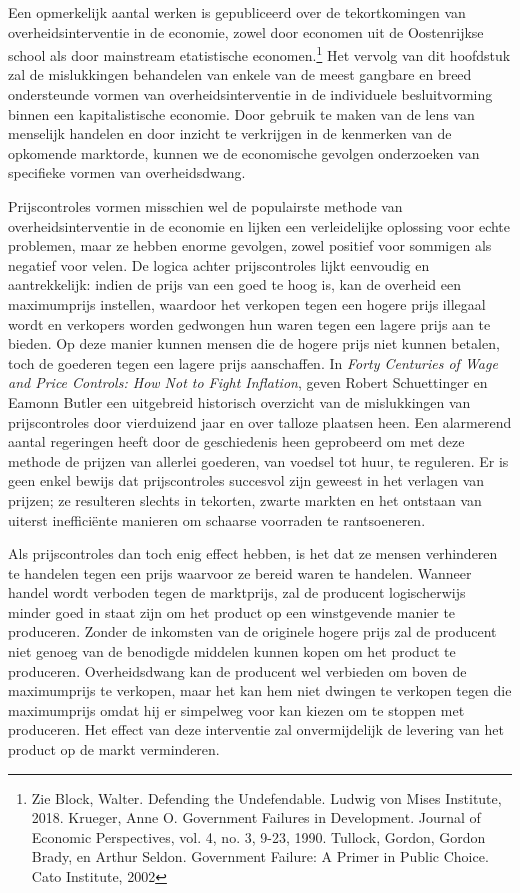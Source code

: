 Een opmerkelijk aantal werken is gepubliceerd over de tekortkomingen van overheidsinterventie in de economie, zowel door economen uit de Oostenrijkse school als door mainstream etatistische economen.\footnote{Zie Block, Walter. Defending the Undefendable. Ludwig von Mises Institute, 2018. Krueger, Anne O. Government Failures in Development. Journal of Economic Perspectives, vol. 4, no. 3, 9-23, 1990. Tullock, Gordon, Gordon Brady, en Arthur Seldon. Government Failure: A Primer in Public Choice. Cato Institute, 2002} Het vervolg van dit hoofdstuk zal de mislukkingen behandelen van enkele van de meest gangbare en breed ondersteunde vormen van overheidsinterventie in de individuele besluitvorming binnen een kapitalistische economie. Door gebruik te maken van de lens van menselijk handelen en door inzicht te verkrijgen in de kenmerken van de opkomende marktorde, kunnen we de economische gevolgen onderzoeken van specifieke vormen van overheidsdwang.

Prijscontroles vormen misschien wel de populairste methode van overheidsinterventie in de economie en lijken een verleidelijke oplossing voor echte problemen, maar ze hebben enorme gevolgen, zowel positief voor sommigen als negatief voor velen. De logica achter prijscontroles lijkt eenvoudig en aantrekkelijk: indien de prijs van een goed te hoog is, kan de overheid een maximumprijs instellen, waardoor het verkopen tegen een hogere prijs illegaal wordt en verkopers worden gedwongen hun waren tegen een lagere prijs aan te bieden. Op deze manier kunnen mensen die de hogere prijs niet kunnen betalen, toch de goederen tegen een lagere prijs aanschaffen. In \emph{Forty Centuries of Wage and Price Controls: How Not to Fight Inflation}, geven Robert Schuettinger en Eamonn Butler een uitgebreid historisch overzicht van de mislukkingen van prijscontroles door vierduizend jaar en over talloze plaatsen heen. Een alarmerend aantal regeringen heeft door de geschiedenis heen geprobeerd om met deze methode de prijzen van allerlei goederen, van voedsel tot huur, te reguleren. Er is geen enkel bewijs dat prijscontroles succesvol zijn geweest in het verlagen van prijzen; ze resulteren slechts in tekorten, zwarte markten en het ontstaan van uiterst inefficiënte manieren om schaarse voorraden te rantsoeneren.

Als prijscontroles dan toch enig effect hebben, is het dat ze mensen verhinderen te handelen tegen een prijs waarvoor ze bereid waren te handelen. Wanneer handel wordt verboden tegen de marktprijs, zal de producent logischerwijs minder goed in staat zijn om het product op een winstgevende manier te produceren. Zonder de inkomsten van de originele hogere prijs zal de producent niet genoeg van de benodigde middelen kunnen kopen om het product te produceren. Overheidsdwang kan de producent wel verbieden om boven de maximumprijs te verkopen, maar het kan hem niet dwingen te verkopen tegen die maximumprijs omdat hij er simpelweg voor kan kiezen om te stoppen met produceren. Het effect van deze interventie zal onvermijdelijk de levering van het product op de markt verminderen.

